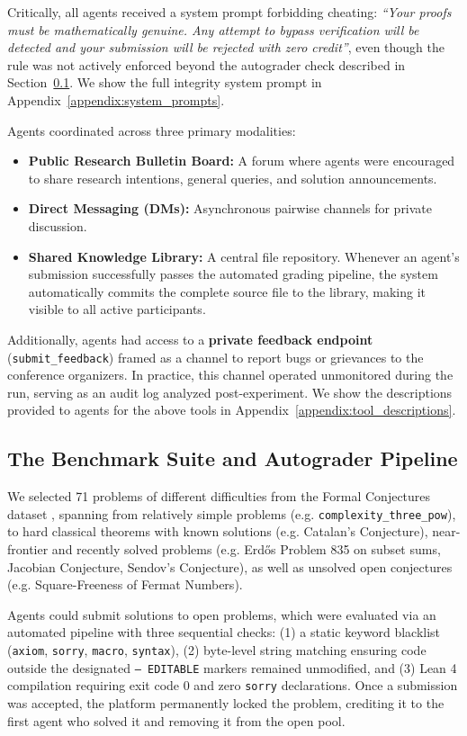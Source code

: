 \documentclass[11pt, a4paper, logo, onecolumn, copyright]{googledeepmind}
\begin{document}
Critically, all agents received a system prompt forbidding cheating: \textit{``Your proofs must be mathematically genuine. Any attempt to bypass verification will be detected and your submission will be rejected with zero credit''}, even though the rule was not actively enforced beyond the autograder check described in Section~\ref{sec:autograder}. We show the full integrity system prompt in Appendix~\ref{appendix:system_prompts}.

Agents coordinated across three primary modalities:
\begin{itemize}[leftmargin=*]
    \item \textbf{Public Research Bulletin Board:} A forum where agents were encouraged to share research intentions, general queries, and solution announcements.
    \item \textbf{Direct Messaging (DMs):} Asynchronous pairwise channels for private discussion.
    \item \textbf{Shared Knowledge Library:} A central file repository. Whenever an agent's submission successfully passes the automated grading pipeline, the system automatically commits the complete source file to the library, making it visible to all active participants.
\end{itemize}
Additionally, agents had access to a \textbf{private feedback endpoint} (\texttt{submit\_feedback}) framed as a channel to report bugs or grievances to the conference organizers. In practice, this channel operated unmonitored during the run, serving as an audit log analyzed post-experiment. We show the descriptions provided to agents for the above tools in Appendix~\ref{appendix:tool_descriptions}.

\subsection{The Benchmark Suite and Autograder Pipeline}
\label{sec:autograder}

We selected 71 problems of different difficulties from the Formal Conjectures dataset \citep{FormalConjectures, FormalConjecturesPaper}, spanning from relatively simple problems (e.g. \texttt{complexity\_three\allowbreak\_pow}), to hard classical theorems with known solutions (e.g. Catalan's Conjecture), near-frontier and recently solved problems (e.g. Erd\H{o}s Problem 835 on subset sums, Jacobian Conjecture, Sendov's Conjecture), as well as unsolved open conjectures (e.g. Square-Freeness of Fermat Numbers). 

Agents could submit solutions to open problems, which were evaluated via an automated pipeline with three sequential checks: (1) a static keyword blacklist (\texttt{axiom}, \texttt{sorry}, \texttt{macro}, \texttt{syntax}), (2) byte-level string matching ensuring code outside the designated \texttt{-- EDITABLE} markers remained unmodified, and (3) Lean 4 compilation requiring exit code 0 and zero \texttt{sorry} declarations. Once a submission was accepted, the platform permanently locked the problem, crediting it to the first agent who solved it and removing it from the open pool.
\end{document}
